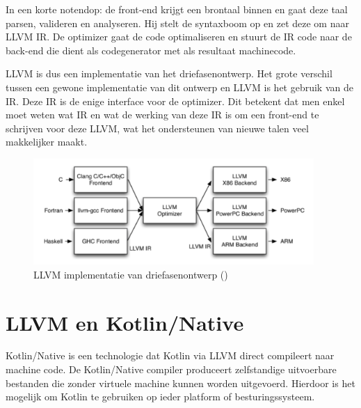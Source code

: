 In een korte notendop: de front-end krijgt een brontaal binnen en gaat deze taal parsen, valideren en analyseren. Hij stelt de syntaxboom op en zet deze om naar LLVM IR. De optimizer gaat de code optimaliseren en stuurt de IR code naar de back-end die dient als codegenerator met als resultaat machinecode.

LLVM is dus een implementatie van het driefasenontwerp. Het grote verschil tussen een gewone implementatie van dit ontwerp en LLVM is het gebruik van de IR. Deze IR is de enige interface voor de optimizer. Dit betekent dat men enkel moet weten wat IR en wat de werking van deze IR is om een front-end te schrijven voor deze LLVM, wat het ondersteunen van nieuwe talen veel makkelijker maakt.

\begin{figure} [ht]
	\centering
	\includegraphics[width=0.95\textwidth]{img/llvmirdriefasen}
	\caption{LLVM implementatie van driefasenontwerp (\cite{aosa})}
	\label{fig:llvmirdriefasen}
\end{figure}

\section{LLVM en Kotlin/Native}
Kotlin/Native is een technologie dat Kotlin via LLVM direct compileert naar machine code. De Kotlin/Native compiler produceert zelfstandige uitvoerbare bestanden die zonder virtuele machine kunnen worden uitgevoerd. Hierdoor is het mogelijk om Kotlin te gebruiken op ieder platform of besturingssysteem.


